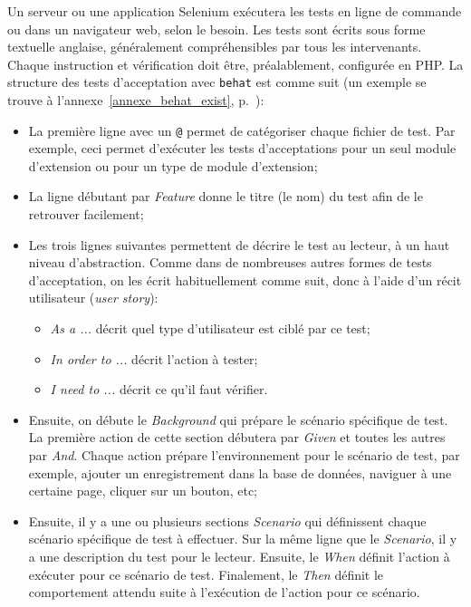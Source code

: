 Un serveur ou une application Selenium ex\'ecutera les tests en ligne de commande ou dans un navigateur web, selon le besoin.
Les tests sont \'ecrits sous forme textuelle anglaise, g\'en\'eralement compr\'ehensibles par tous les intervenants.
Chaque instruction et v\'erification doit \^etre, pr\'ealablement, configur\'ee en PHP.
La structure des tests d'acceptation avec \texttt{behat} est comme suit (un exemple se trouve à l'annexe~\ref{annexe_behat_exist}, p.~\pageref{annexe_behat_exist}):
\begin{itemize}
  \item La premi\`ere ligne avec un \verb|@| permet de cat\'egoriser chaque fichier de test.
        Par exemple, ceci permet d'ex\'ecuter les tests d'acceptations pour un seul module d'extension ou pour un type de module d'extension;
        
  \item La ligne d\'ebutant par \textit{Feature} donne le titre (le nom) du test afin de le retrouver facilement;
  
  \item Les trois lignes suivantes permettent de d\'ecrire le test au lecteur, \`a un haut niveau d'abstraction.
        Comme dans de nombreuses autres formes de tests d'acceptation, on les \'ecrit habituellement comme suit, donc \`a l'aide d'un r\'ecit utilisateur (\emph{user story}):
        
        \begin{itemize}
          \item \og \textit{As a ...} \fg{} d\'ecrit quel type d'utilisateur est cibl\'e par ce test;
          \item \og \textit{In order to ...} \fg{} d\'ecrit l'action \`a tester;
          \item \og \textit{I need to ...} \fg{} d\'ecrit ce qu'il faut v\'erifier.
        \end{itemize}
        
  \item Ensuite, on d\'ebute le \textit{Background} qui pr\'epare le sc\'enario sp\'ecifique de test.
        La premi\`ere action de cette section d\'ebutera par \textit{Given} et toutes les autres par \textit{And}.
        Chaque action pr\'epare l'environnement pour le sc\'enario de test, par exemple, ajouter un enregistrement dans la base de donn\'ees, naviguer \`a une certaine page, cliquer sur un bouton, etc;
        
  \item Ensuite, il y a une ou plusieurs sections \textit{Scenario} qui d\'efinissent chaque sc\'enario sp\'ecifique de test \`a effectuer.
        Sur la m\^eme ligne que le \textit{Scenario}, il y a une description du test pour le lecteur.
        Ensuite, le \textit{When} d\'efinit l'action \`a ex\'ecuter pour ce sc\'enario de test.
        Finalement, le \textit{Then} d\'efinit le comportement attendu suite \`a l'ex\'ecution de l'action pour ce sc\'enario.
\end{itemize}

